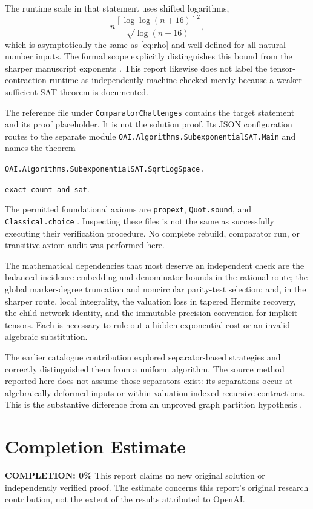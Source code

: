\documentclass[11pt,a4paper]{article}
\numberwithin{equation}{section}
\theoremstyle{definition}
\theoremstyle{remark}
\begin{document}
The runtime scale in that statement uses shifted logarithms,
\[
 n\frac{[\log\log(n+16)]^2}{\sqrt{\log(n+16)}},
\]
which is asymptotically the same as \eqref{eq:rho} and well-defined for all
natural-number inputs. The formal scope explicitly distinguishes this bound
from the sharper manuscript exponents \cite{scope}. This report likewise
does not label the tensor-contraction runtime as independently machine-checked
merely because a weaker sufficient SAT theorem is documented.

The reference file under \texttt{ComparatorChallenges} contains the target
statement and its proof placeholder. It is not the solution proof. Its JSON
configuration routes to the separate module
\texttt{OAI.Algorithms.SubexponentialSAT.Main} and names the theorem
\begin{center}\small
\texttt{OAI.Algorithms.SubexponentialSAT.SqrtLogSpace.}\par
\texttt{exact\_count\_and\_sat}.
\end{center}
The permitted foundational axioms are \texttt{propext}, \texttt{Quot.sound},
and \texttt{Classical.choice} \cite{config,solution}.
Inspecting these files is not the same as successfully executing their
verification procedure. No complete rebuild, comparator run, or transitive
axiom audit was performed here.

The mathematical dependencies that most deserve an independent check are the
balanced-incidence embedding and denominator bounds in the rational route;
the global marker-degree truncation and noncircular parity-test selection;
and, in the sharper route, local integrality, the valuation loss in tapered
Hermite recovery, the child-network identity, and the immutable precision
convention for implicit tensors. Each is necessary to rule out a hidden
exponential cost or an invalid algebraic substitution.

The earlier catalogue contribution explored separator-based strategies and
correctly distinguished them from a uniform algorithm. The source method
reported here does not assume those separators exist: its separations occur
at algebraically deformed inputs or within valuation-indexed recursive
contractions. This is the substantive difference from an unproved graph
partition hypothesis \cite{catalogue}.

\section{Completion Estimate}
\noindent\textbf{COMPLETION: 0\%}
This report claims no new original solution or independently verified proof. The estimate concerns this report's original research contribution, not the extent of the results attributed to OpenAI.
\end{document}
